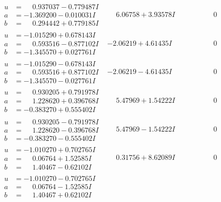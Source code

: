 \documentclass[1p]{elsarticle_modified}
\theoremstyle{definition}
\begin{document}
$$\begin{array}{c|c|c}
\begin{aligned}
u &= \phantom{-}0.937037 - 0.779487 I \\
a &= -1.369200 - 0.010031 I \\
b &= \phantom{-}0.294442 + 0.779185 I\end{aligned}
 & \phantom{-}6.06758 + 3.93578 I & \phantom{-0.000000 } 0 \\ \hline\begin{aligned}
u &= -1.015290 + 0.678143 I \\
a &= \phantom{-}0.593516 - 0.877102 I \\
b &= -1.345570 + 0.027761 I\end{aligned}
 & -2.06219 + 4.61435 I & \phantom{-0.000000 } 0 \\ \hline\begin{aligned}
u &= -1.015290 - 0.678143 I \\
a &= \phantom{-}0.593516 + 0.877102 I \\
b &= -1.345570 - 0.027761 I\end{aligned}
 & -2.06219 - 4.61435 I & \phantom{-0.000000 } 0 \\ \hline\begin{aligned}
u &= \phantom{-}0.930205 + 0.791978 I \\
a &= \phantom{-}1.228620 + 0.396768 I \\
b &= -0.383270 + 0.555402 I\end{aligned}
 & \phantom{-}5.47969 + 1.54222 I & \phantom{-0.000000 } 0 \\ \hline\begin{aligned}
u &= \phantom{-}0.930205 - 0.791978 I \\
a &= \phantom{-}1.228620 - 0.396768 I \\
b &= -0.383270 - 0.555402 I\end{aligned}
 & \phantom{-}5.47969 - 1.54222 I & \phantom{-0.000000 } 0 \\ \hline\begin{aligned}
u &= -1.010270 + 0.702765 I \\
a &= \phantom{-}0.06764 + 1.52585 I \\
b &= \phantom{-}1.40467 - 0.62102 I\end{aligned}
 & \phantom{-}0.31756 + 8.62089 I & \phantom{-0.000000 } 0 \\ \hline\begin{aligned}
u &= -1.010270 - 0.702765 I \\
a &= \phantom{-}0.06764 - 1.52585 I \\
b &= \phantom{-}1.40467 + 0.62102 I\end{aligned}

\end{array}$$
\end{document}
